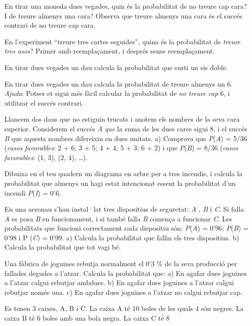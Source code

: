 \begin{mylist}
\item
En tirar una moneda dues vegades, quin és la probabilitat de no treure
cap cara? I de treure almenys una cara? Observa que treure almenys una
cara és el succés contrari de no treure cap cara.
\item
En l'experiment ``treure tres cartes seguides'', quina és la
probabilitat de \emph{treure tres asos}? Primer amb reemplaçament, i
després sense reemplaçament.
\item
En tirar dues vegades un dau calcula la probabilitat que surti un sis
doble. 
\item
En tirar dues vegades un dau calcula la probabilitat de treure almenys
un 6. \emph{Ajuda}: Potser et sigui més fàcil calcular la probabilitat
de \emph{no treure cap} 6, i utilitzar el succés contrari.
\item
Llancem dos daus que no estiguin trucats i anotem els nombres de la
seva cara superior. Considerem el succés \emph{A que} la suma de les
dues cares sigui 8, i el succés \emph{B} que aquests nombres
difereixin en dues unitats. a) Comprova que \emph{P}(\emph{A}) = 5/36
(\emph{casos favorables}: 2 + 6; 3 + 5; 4 + 4; 5 + 3; 6 + 2) i que
\emph{P}(\emph{B}) = 8/36 (\emph{casos favorables}: (1, 3), (2, 4),
\ldots{}). 
\item
Dibuixa en el teu quadern un diagrama en arbre per a tres incendis, i
calcula la probabilitat que almenys un hagi estat intencionat essent
la probabilitat d'un incendi \emph{P}(\emph{I}) = 0'6.
\item
En una aeronau s'han instal·lat tres dispositius de seguretat:
\emph{A} \emph{, B} i \emph{C}. Si falla \emph{A} es posa \emph{B} en
funcionament, i si també falla \emph{B} comença a funcionar \emph{C}.
Les probabilitats que funcioni correctament cada dispositiu són:
\emph{P}(\emph{A}) = 0'96; \emph{P}(\emph{B}) = 0'98 i P (\emph{C}) =
0'99. a) Calcula la probabilitat que fallin els tres dispositius. b)
Calcula la probabilitat que tot vagi bé.
\item
Una fàbrica de joguines rebutja normalment el 0'3 \% de la seva
producció per fallades degudes a l'atzar. Calcula la probabilitat que:
a) En agafar dues joguines a l'atzar calgui rebutjar ambdues. b) En
agafar dues joguines a l'atzar calgui rebutjar només una. c) En agafar
dues joguines a l'atzar no calgui rebutjar cap. 
\item
Es tenen 3 caixes, A, B i C. La caixa A té 10 boles de les quals 4 són
negres. La caixa B té 6 boles amb una bola negra. La caixa C té 8

\end{mylist}
